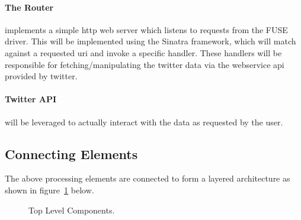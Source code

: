 \paragraph{The Router} implements a simple http web server which listens to requests from
the FUSE driver. This will be implemented using the Sinatra framework, which
will match against a requested uri and invoke a specific handler. These handlers
will be responsible for fetching/manipulating the twitter data via the
webservice api provided by twitter.

\paragraph{Twitter API} will be leveraged to actually interact with the data as
requested by the user.

\subsection{Connecting Elements}

The above processing elements are connected to form a layered architecture as
shown in figure~\ref{fig:top-top} below.

\begin{figure}[h]
\centering
{}
\caption{Top Level Components.}\label{fig:top-top}
\end{figure}

